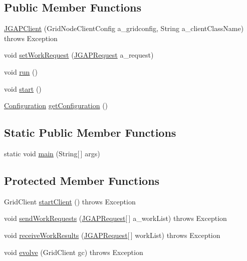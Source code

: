 \subsection*{Public Member Functions}
\begin{DoxyCompactItemize}
\item 
\hyperlink{classorg_1_1jgap_1_1distr_1_1grid_1_1_j_g_a_p_client_a554a71b0520a575d0558919a58966de6}{J\-G\-A\-P\-Client} (Grid\-Node\-Client\-Config a\-\_\-gridconfig, String a\-\_\-client\-Class\-Name)  throws Exception 
\item 
void \hyperlink{classorg_1_1jgap_1_1distr_1_1grid_1_1_j_g_a_p_client_a9524c9e80ebe6fc765f692be6ee3f7ef}{set\-Work\-Request} (\hyperlink{classorg_1_1jgap_1_1distr_1_1grid_1_1_j_g_a_p_request}{J\-G\-A\-P\-Request} a\-\_\-request)
\item 
void \hyperlink{classorg_1_1jgap_1_1distr_1_1grid_1_1_j_g_a_p_client_a71180f59d875f8289f434a3ed34cd1c5}{run} ()
\item 
void \hyperlink{classorg_1_1jgap_1_1distr_1_1grid_1_1_j_g_a_p_client_a997bd52c2094d339d386be63e006f71f}{start} ()
\item 
\hyperlink{classorg_1_1jgap_1_1_configuration}{Configuration} \hyperlink{classorg_1_1jgap_1_1distr_1_1grid_1_1_j_g_a_p_client_abba9f6566a4d1b90696cdb0d3c86950e}{get\-Configuration} ()
\end{DoxyCompactItemize}
\subsection*{Static Public Member Functions}
\begin{DoxyCompactItemize}
\item 
static void \hyperlink{classorg_1_1jgap_1_1distr_1_1grid_1_1_j_g_a_p_client_af3d37a0dae2241b15eddd64b75174b14}{main} (String\mbox{[}$\,$\mbox{]} args)
\end{DoxyCompactItemize}
\subsection*{Protected Member Functions}
\begin{DoxyCompactItemize}
\item 
Grid\-Client \hyperlink{classorg_1_1jgap_1_1distr_1_1grid_1_1_j_g_a_p_client_a9b1f7783c9329ec28bae73fc18fe2312}{start\-Client} ()  throws Exception 
\item 
void \hyperlink{classorg_1_1jgap_1_1distr_1_1grid_1_1_j_g_a_p_client_abc56375e54a01d81570c1f31a9de2e14}{send\-Work\-Requests} (\hyperlink{classorg_1_1jgap_1_1distr_1_1grid_1_1_j_g_a_p_request}{J\-G\-A\-P\-Request}\mbox{[}$\,$\mbox{]} a\-\_\-work\-List)  throws Exception 
\item 
void \hyperlink{classorg_1_1jgap_1_1distr_1_1grid_1_1_j_g_a_p_client_a40fc96f07c3fb4c8147a62341658f96b}{receive\-Work\-Results} (\hyperlink{classorg_1_1jgap_1_1distr_1_1grid_1_1_j_g_a_p_request}{J\-G\-A\-P\-Request}\mbox{[}$\,$\mbox{]} work\-List)  throws Exception 
\item 
void \hyperlink{classorg_1_1jgap_1_1distr_1_1grid_1_1_j_g_a_p_client_ada0a60975808f24e726e6acf51b26da1}{evolve} (Grid\-Client gc)  throws Exception 
\end{DoxyCompactItemize}
